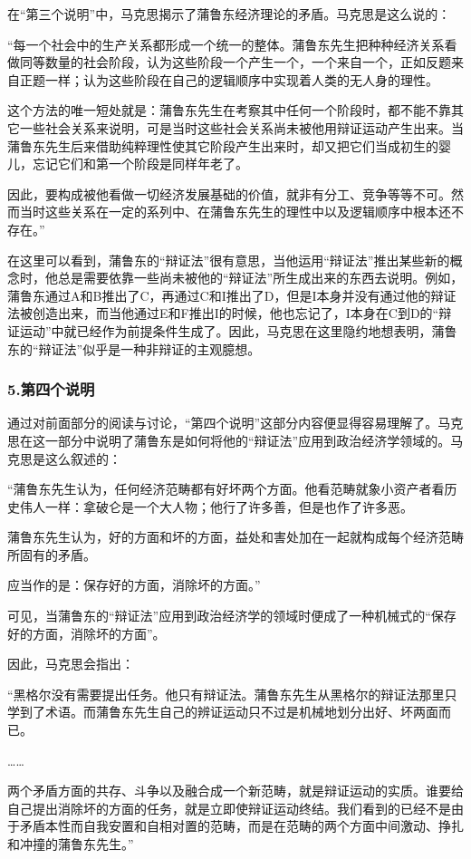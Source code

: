 \documentclass[a4paper,twoside,12pt,AutoFakeBold]{ctexart}
\begin{document}
在“第三个说明”中，马克思揭示了蒲鲁东经济理论的矛盾。马克思是这么说的：

\begin{adjustwidth}{2em}{2em}
    \qquad\fangsong
    “每一个社会中的生产关系都形成一个统一的整体。蒲鲁东先生把种种经济关系看做同等数量的社会阶段，认为这些阶段一个产生一个，一个来自一个，正如反题来自正题一样；认为这些阶段在自己的逻辑顺序中实现着人类的无人身的理性。

这个方法的唯一短处就是：蒲鲁东先生在考察其中任何一个阶段时，都不能不靠其它一些社会关系来说明，可是当时这些社会关系尚未被他用辩证运动产生出来。当蒲鲁东先生后来借助纯粹理性使其它阶段产生出来时，却又把它们当成初生的婴儿，忘记它们和第一个阶段是同样年老了。

因此，要构成被他看做一切经济发展基础的价值，就非有分工、竞争等等不可。然而当时这些关系在一定的系列中、在蒲鲁东先生的理性中以及逻辑顺序中根本还不存在。”
\end{adjustwidth}
在这里可以看到，蒲鲁东的“辩证法”很有意思，当他运用“辩证法”推出某些新的概念时，他总是需要依靠一些尚未被他的“辩证法”所生成出来的东西去说明。例如，蒲鲁东通过A和B推出了C，再通过C和I推出了D，但是I本身并没有通过他的辩证法被创造出来，而当他通过E和F推出I的时候，他也忘记了，I本身在C到D的“辩证运动”中就已经作为前提条件生成了。因此，马克思在这里隐约地想表明，蒲鲁东的“辩证法”似乎是一种非辩证的主观臆想。

\subsubsection{5.第四个说明}

通过对前面部分的阅读与讨论，“第四个说明”这部分内容便显得容易理解了。马克思在这一部分中说明了蒲鲁东是如何将他的“辩证法”应用到政治经济学领域的。马克思是这么叙述的：

\begin{adjustwidth}{2em}{2em}
    \qquad\fangsong
“蒲鲁东先生认为，任何经济范畴都有好坏两个方面。他看范畴就象小资产者看历史伟人一样：拿破仑是一个大人物；他行了许多善，但是也作了许多恶。

蒲鲁东先生认为，好的方面和坏的方面，益处和害处加在一起就构成每个经济范畴所固有的矛盾。

应当作的是：保存好的方面，消除坏的方面。”
\end{adjustwidth}

可见，当蒲鲁东的“辩证法”应用到政治经济学的领域时便成了一种机械式的“保存好的方面，消除坏的方面”。

因此，马克思会指出：

\begin{adjustwidth}{2em}{2em}
\qquad\fangsong
    “黑格尔没有需要提出任务。他只有辩证法。蒲鲁东先生从黑格尔的辩证法那里只学到了术语。而蒲鲁东先生自己的辨证运动只不过是机械地划分出好、坏两面而已。
    
    ……
    
    两个矛盾方面的共存、斗争以及融合成一个新范畴，就是辩证运动的实质。谁要给自己提出消除坏的方面的任务，就是立即使辩证运动终结。我们看到的已经不是由于矛盾本性而自我安置和自相对置的范畴，而是在范畴的两个方面中间激动、挣扎和冲撞的蒲鲁东先生。”

\end{adjustwidth}
    
\end{document}
